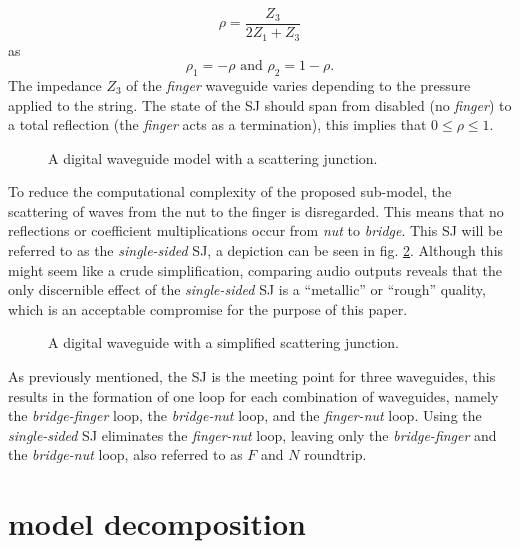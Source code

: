 \documentclass{sigchi}
\begin{document}
\begin{equation} \label{eq:rho}
	\rho=\frac{Z_3}{2Z_1+Z_3}
\end{equation}
as
\begin{equation}
	\rho_1=-\rho \text{ and } \rho_2=1-\rho.
\end{equation}
The impedance $Z_3$ of the \textit{finger} waveguide varies depending to the pressure applied to the string. The state of the SJ should span from disabled (no \textit{finger}) to a total reflection (the \textit{finger} acts as a termination),  this implies that $0 \leq \rho \leq 1$.

\begin{figure}[h]
	\centering
	\scalebox{0.56}{}
	\caption{A digital waveguide model with a scattering junction.}
	\label{fig:waveguide_sj}
\end{figure}

To reduce the computational complexity of the proposed sub-model, the scattering of waves from the nut to the finger is disregarded. This means that no reflections or coefficient multiplications occur from \textit{nut} to \textit{bridge}. This SJ will be referred to as the \textit{single-sided} SJ, a depiction can be seen in fig. \ref{fig:waveguide_simple_sj}. Although this might seem like a crude simplification, comparing audio outputs reveals that the only discernible effect of the \textit{single-sided} SJ is a ``metallic'' or ``rough'' quality, which is an acceptable compromise for the purpose of this paper.
\begin{figure}[h]
	\centering
	\scalebox{0.6}{}
	\caption{A digital waveguide with a simplified scattering junction.}
	\label{fig:waveguide_simple_sj}
\end{figure}

As previously mentioned, the SJ is the meeting point for three waveguides, this results in the formation of one loop for each combination of waveguides, namely the \textit{bridge-finger} loop, the \textit{bridge-nut} loop, and the \textit{finger-nut} loop. Using the \textit{single-sided} SJ eliminates the \textit{finger-nut} loop, leaving only the \textit{bridge-finger} and the \textit{bridge-nut} loop, also referred to as $F$ and $N$ roundtrip.

\section{model decomposition}
\end{document}
